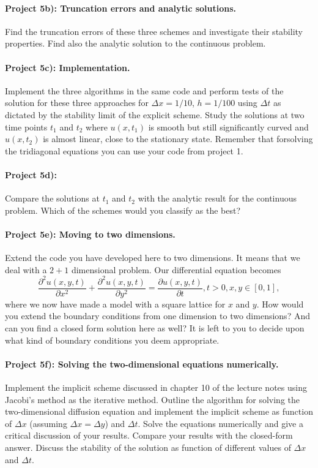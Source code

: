 \documentclass[%
oneside,                 %
final,                   %
10pt]{article}
\begin{document}
\paragraph{Project 5b): Truncation errors and analytic solutions.}
Find the truncation errors of these three schemes and investigate their stability properties.
Find also the analytic solution to the continuous problem. 

\paragraph{Project 5c): Implementation.}
Implement the three algorithms in the same code and perform tests of the solution 
for these three approaches
for $\Delta x=1/10$, $h=1/100$ using  $\Delta t$ as dictated by the stability limit of the explicit scheme.
Study the solutions at two time points $t_1$ and $t_2$ where $u(x,t_1)$ is smooth but still significantly curved
and $u(x,t_2)$ is almost linear, close to the stationary state.
Remember that forsolving the tridiagonal equations you can use your code from project 1.  
\paragraph{Project 5d):}
Compare the solutions at $t_1$ and $t_2$ with the analytic result for the continuous problem.
Which of the schemes would you classify as the best?

\paragraph{Project 5e): Moving to two dimensions.}
Extend the code you have developed here to two
  dimensions. 
It means that we deal with a $2+1$ dimensional problem. Our differential equation becomes
\[
 \frac{\partial^2 u(x,y,t)}{\partial x^2}+\frac{\partial^2 u(x,y,t)}{\partial y^2} =\frac{\partial u(x,y,t)}{\partial t}, t> 0, x,y\in [0,1],
\]
where we now have made a model with a square lattice for $x$ and $y$. 
How would you extend the boundary conditions from one dimension to two dimensions? And can you
  find a closed form solution here as well?  It is left to you to decide upon what kind of boundary conditions
you deem appropriate.
\paragraph{Project 5f): Solving the two-dimensional equations numerically.}
Implement the implicit scheme discussed in chapter 10 of the lecture notes using Jacobi's method as the iterative method.
Outline the algorithm for solving the two-dimensional diffusion equation and 
implement the implicit scheme as function of $\Delta x$ (assuming
$\Delta x = \Delta y$) and $\Delta t$. Solve the equations numerically and give a critical discussion of your results. 
Compare your results with the closed-form answer. Discuss the stability
of the solution as function of different values of $\Delta x$  and $\Delta t$. 
\end{document}
